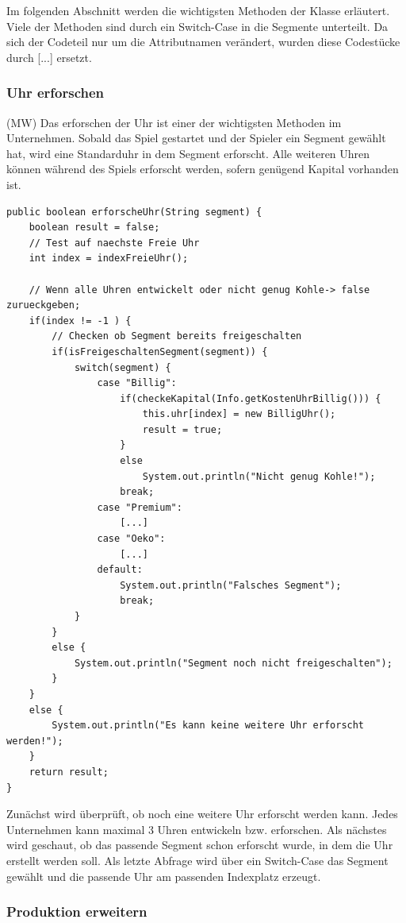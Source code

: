 Im folgenden Abschnitt werden die wichtigsten Methoden der Klasse erläutert. Viele der Methoden sind durch ein Switch-Case in die Segmente unterteilt. Da sich der Codeteil nur um die Attributnamen verändert, wurden diese Codestücke durch [...] ersetzt.

\subsubsection{Uhr erforschen}
(MW) Das erforschen der Uhr ist einer der wichtigsten Methoden im Unternehmen. Sobald das Spiel gestartet und der Spieler ein Segment gewählt hat, wird eine Standarduhr in dem Segment erforscht. Alle weiteren Uhren können während des Spiels erforscht werden, sofern genügend Kapital vorhanden ist. 

\lstset{language=Java} 
\begin{lstlisting}[caption={Neue Uhr erforschen},captionpos=b]
public boolean erforscheUhr(String segment) {
	boolean result = false;
	// Test auf naechste Freie Uhr
	int index = indexFreieUhr();
	
	// Wenn alle Uhren entwickelt oder nicht genug Kohle-> false zurueckgeben;
	if(index != -1 ) {
		// Checken ob Segment bereits freigeschalten
		if(isFreigeschaltenSegment(segment)) {
			switch(segment) {
				case "Billig":
					if(checkeKapital(Info.getKostenUhrBillig())) {
						this.uhr[index] = new BilligUhr();
						result = true;
					}
					else
						System.out.println("Nicht genug Kohle!");
					break;
				case "Premium":
					[...]
				case "Oeko":
					[...]
				default:
					System.out.println("Falsches Segment");
					break;
			}
		}
		else {
			System.out.println("Segment noch nicht freigeschalten");
		}
	}
	else {
		System.out.println("Es kann keine weitere Uhr erforscht werden!");
	}
	return result;
}
\end{lstlisting}

Zunächst wird überprüft, ob noch eine weitere Uhr erforscht werden kann. Jedes Unternehmen kann maximal 3 Uhren entwickeln bzw. erforschen. Als nächstes wird geschaut, ob das passende Segment schon erforscht wurde, in dem die Uhr erstellt werden soll. Als letzte Abfrage wird über ein Switch-Case das Segment gewählt und die passende Uhr am passenden Indexplatz erzeugt.

\subsubsection{Produktion erweitern}

